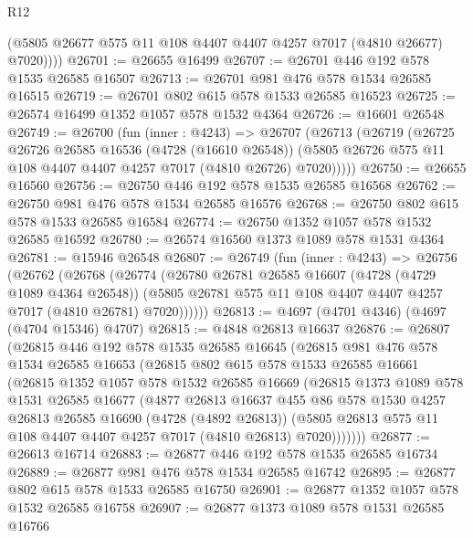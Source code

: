 \begin{lexlean}{R12}
\begin{coremodule}
          (@5805 @26677 @575 @11 @108 @4407 @4407 @4257 @7017 (@4810 @26677) @7020))))
@26701 := @26655 @16499
@26707 := @26701 @446 @192 @578 @1535 @26585 @16507
@26713 := @26701 @981 @476 @578 @1534 @26585 @16515
@26719 := @26701 @802 @615 @578 @1533 @26585 @16523
@26725 := @26574 @16499 @1352 @1057 @578 @1532 @4364
@26726 := @16601 @26548
@26749 := @26700
    (fun (inner : @4243) =>
    @26707
      (@26713
        (@26719
          (@26725
            @26726
            @26585
            @16536
            (@4728 (@16610 @26548))
            (@5805 @26726 @575 @11 @108 @4407 @4407 @4257 @7017 (@4810 @26726) @7020)))))
@26750 := @26655 @16560
@26756 := @26750 @446 @192 @578 @1535 @26585 @16568
@26762 := @26750 @981 @476 @578 @1534 @26585 @16576
@26768 := @26750 @802 @615 @578 @1533 @26585 @16584
@26774 := @26750 @1352 @1057 @578 @1532 @26585 @16592
@26780 := @26574 @16560 @1373 @1089 @578 @1531 @4364
@26781 := @15946 @26548
@26807 := @26749
    (fun (inner : @4243) =>
    @26756
      (@26762
        (@26768
          (@26774
            (@26780
              @26781
              @26585
              @16607
              (@4728 (@4729 @1089 @4364 @26548))
              (@5805 @26781 @575 @11 @108 @4407 @4407 @4257 @7017 (@4810 @26781) @7020))))))
@26813 := @4697 (@4701 @4346) (@4697 (@4704 @15346) @4707)
@26815 := @4848 @26813 @16637
@26876 := @26807
    (@26815
      @446
      @192
      @578
      @1535
      @26585
      @16645
      (@26815
        @981
        @476
        @578
        @1534
        @26585
        @16653
        (@26815
          @802
          @615
          @578
          @1533
          @26585
          @16661
          (@26815
            @1352
            @1057
            @578
            @1532
            @26585
            @16669
            (@26815
              @1373
              @1089
              @578
              @1531
              @26585
              @16677
              (@4877
                @26813
                @16637
                @455
                @86
                @578
                @1530
                @4257
                @26813
                @26585
                @16690
                (@4728 (@4892 @26813))
                (@5805 @26813 @575 @11 @108 @4407 @4407 @4257 @7017 (@4810 @26813) @7020)))))))
@26877 := @26613 @16714
@26883 := @26877 @446 @192 @578 @1535 @26585 @16734
@26889 := @26877 @981 @476 @578 @1534 @26585 @16742
@26895 := @26877 @802 @615 @578 @1533 @26585 @16750
@26901 := @26877 @1352 @1057 @578 @1532 @26585 @16758
@26907 := @26877 @1373 @1089 @578 @1531 @26585 @16766

\end{coremodule}
\end{lexlean}
